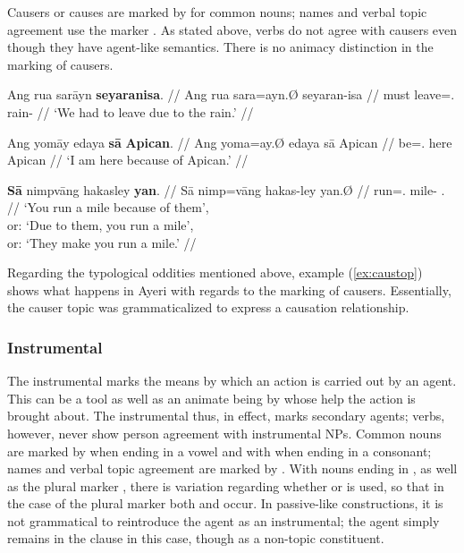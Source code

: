 Causers or causes are marked by  for common nouns; names and
verbal topic agreement use the marker . As stated above, verbs do
not agree with causers even though they have agent-like semantics. There is no
animacy distinction in the marking of causers.

\pex
\a\begingl
	\gla Ang rua sarāyn \textbf{seyaranisa}. //
	\glb Ang rua sara=ayn.Ø seyaran-isa //
	\glc \AgtT{} must leave=\Fpl{}.\Top{} rain-\Caus{} //
	\glft `We had to leave due to the rain.' //
\endgl

\a\begingl
	\gla Ang yomāy edaya \textbf{sā} \textbf{Apican}. //
	\glb Ang yoma=ay.Ø edaya sā Apican //
	\glc \AgtT{} be=\Fsg{}.\Top{} here \Caus{} Apican //
	\glft `I am here because of Apican.' //
\endgl

\a\label{ex:caustop}\begingl
	\gla \textbf{Sā} nimpvāng hakasley \textbf{yan}. //
	\glb Sā nimp=vāng hakas-ley yan.Ø //
	\glc \CauT{} run=\Ssg{}.\Aarg{} mile-\PargI{} \TplM{}.\Top{} //
	\glft `You run a mile because of them',\\
		or: `Due to them, you run a mile',\\
		or: `They make you run a mile.' //
\endgl

\xe

Regarding the typological oddities mentioned above, example (\ref{ex:caustop}) 
shows what happens in Ayeri with regards to the marking of causers. 
Essentially, the causer topic was grammaticalized to express a causation 
relationship.


\subsubsection{Instrumental}
\label{subsubsec:instrumental}

The instrumental marks the means by which an action is carried out by an agent.
This can be a tool as well as an animate being by whose help the action is
brought about. The instrumental thus, in effect, marks secondary agents; verbs,
however, never show person agreement with instrumental NPs. Common nouns are
marked by  when ending in a vowel and with 
when ending in a consonant; names and verbal topic agreement are marked by
. With nouns ending in , as well as the plural marker 
, there is variation regarding whether  or 
 is used, so that in the case of the plural marker both 
 and  occur. In passive-like 
constructions, it is not grammatical to reintroduce the agent as an
instrumental; the agent simply remains in the clause in this case, though as a
non-topic constituent.

